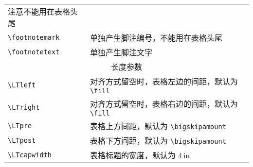 \begin{longtable}{|l|l|}
  注意不能用在表格头尾 \\
\verb=\footnotemark= & 单独产生脚注编号，不能用在表格头尾 \\
\verb=\footnotetext= & 单独产生脚注文字 \\
\hline \multicolumn{2}{|c|}{长度参数} \\ \hline
\verb=\LTleft= & 对齐方式留空时，表格左边的间距，默认为 \verb=\fill= \\
\verb=\LTright= & 对齐方式留空时，表格右边的间距，默认为 \verb=\fill= \\
\verb=\LTpre= & 表格上方间距，默认为 \verb=\bigskipamount= \\
\verb=\LTpost= & 表格下方间距，默认为 \verb=\bigskipamount= \\
\verb=\LTcapwidth= & 表格标题的宽度，默认为 4\,in \\
\end{longtable}
